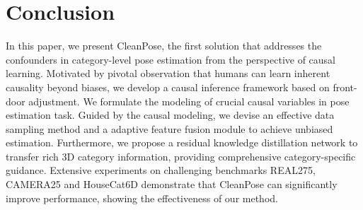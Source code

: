 \section{Conclusion}
\label{sec:conclusion}
In this paper, we present CleanPose, the first solution that addresses the confounders in category-level pose estimation from the perspective of causal learning.
Motivated by pivotal observation that humans can learn inherent causality beyond biases, we develop a causal inference framework based on front-door adjustment. We formulate the modeling of crucial causal variables in pose estimation task. Guided by the causal modeling, we devise an effective data sampling method and a adaptive feature fusion module to achieve unbiased estimation.
Furthermore, we propose a residual knowledge distillation network to transfer rich 3D category information, providing comprehensive category-specific guidance.
Extensive experiments on challenging benchmarks REAL275, CAMERA25 and HouseCat6D demonstrate that CleanPose can significantly improve performance, showing the effectiveness of our method.